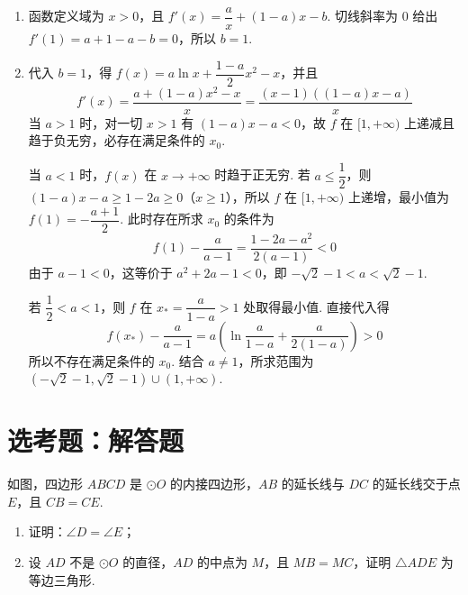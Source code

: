 \begin{solution}
\begin{enumerate}
\item 函数定义域为 \(x>0\)，且 \(f'(x)=\dfrac{a}{x}+(1-a)x-b\). 切线斜率为 \(0\) 给出 \(f'(1)=a+1-a-b=0\)，所以 \(b=1\).
\item 代入 \(b=1\)，得 \(f(x)=a\ln x+\dfrac{1-a}{2}x^2-x\)，并且
\[f'(x)=\frac{a+(1-a)x^2-x}{x}=\frac{(x-1)((1-a)x-a)}{x}\]
当 \(a>1\) 时，对一切 \(x>1\) 有 \((1-a)x-a<0\)，故 \(f\) 在 \([1,+\infty)\) 上递减且趋于负无穷，必存在满足条件的 \(x_0\).

当 \(a<1\) 时，\(f(x)\) 在 \(x\to+\infty\) 时趋于正无穷. 若 \(a\leqslant\dfrac12\)，则 \((1-a)x-a\geqslant1-2a\geqslant0\)（\(x\geqslant1\)），所以 \(f\) 在 \([1,+\infty)\) 上递增，最小值为 \(f(1)=-\dfrac{a+1}{2}\). 此时存在所求 \(x_0\) 的条件为
\[f(1)-\frac{a}{a-1}=\frac{1-2a-a^2}{2(a-1)}<0\]
由于 \(a-1<0\)，这等价于 \(a^2+2a-1<0\)，即 \(-\sqrt2-1<a<\sqrt2-1\).

若 \(\dfrac12<a<1\)，则 \(f\) 在 \(x_* =\dfrac{a}{1-a}>1\) 处取得最小值. 直接代入得
\[f(x_*)-\frac{a}{a-1}=a\left(\ln\frac{a}{1-a}+\frac{a}{2(1-a)}\right)>0\]
所以不存在满足条件的 \(x_0\). 结合 \(a\neq1\)，所求范围为 \((-\sqrt2-1,\sqrt2-1)\cup(1,+\infty)\).
\end{enumerate}
\end{solution}

\section{选考题：解答题}

\begin{problem}
如图，四边形 \(ABCD\) 是 \(\odot O\) 的内接四边形，\(AB\) 的延长线与 \(DC\) 的延长线交于点 \(E\)，且 \(CB = CE\).

\begin{enumerate}
\item 证明：\(\angle D = \angle E\)；
\item 设 \(AD\) 不是 \(\odot O\) 的直径，\(AD\) 的中点为 \(M\)，且 \(MB = MC\)，证明 \(\triangle ADE\) 为等边三角形.
\end{enumerate}

\FloatBarrier
\end{problem}

